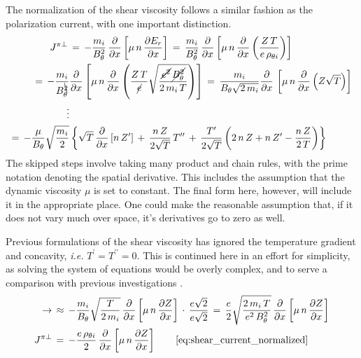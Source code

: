 The normalization of the shear viscosity follows a similar fashion as the polarization current, with one important distinction.
\begin{align} %
	J^{\pi\perp} \,&=\, -\frac{m_i}{B_\theta^2} \,
		\frac{\partial}{\partial x} \left[\mu \, n \, \frac{\partial E_r}
		{\partial x}\right]
		\,=\, \frac{m_i}{B_\theta^2} \, \frac{\partial}{\partial x}
		\left[\mu \, n \, \frac{\partial}{\partial x} \left(\frac{Z \, T}
		{e \, \rho_{\theta i}}\right)\right] \\
	=\, -\frac{m_i}{B_\theta^{\bcancel{2}}} &\frac{\partial}{\partial x}
		\left[\mu \, n \, \frac{\partial}{\partial x}\left(\frac{Z \, T}
		{\cancel{e}} \sqrt{\frac{\cancel{e^2} \,
		\cancel{B_\theta^{2}}}{2 \, m_i \, T}}\right)\right]
		\,=\, \frac{m_i}{B_\theta \sqrt{2 \, m_i}}
		\frac{\partial}{\partial x} \, \left[\mu \, n \, \frac{\partial}
		{\partial x} \left(Z \sqrt{T}\right)\right] \\
	\nonumber\vdots \\
	=\, -\frac{\mu}{B_\theta} \sqrt{\frac{m_i}{2}} &\left\{\sqrt{T} \,
		\frac{\partial}{\partial x} \left[n \, Z^\prime\right] \,+\,
		\frac{n \, Z}{2\sqrt{T}} \, T^{\prime\prime} \,+\,
		\frac{T^\prime}{2\sqrt{T}} \left(2 \, n \, Z + n \, Z^\prime -
		\frac{n \, Z}{2 \, T}\right)\right\}
\end{align}
The skipped steps involve taking many product and chain rules, with the prime notation denoting the spatial derivative.
This includes the assumption that the dynamic viscosity $\mu$ is set to constant.
The final form here, however, will include it in the appropriate place.
One could make the reasonable assumption that, if it does not vary much over space, it's derivatives go to zero as well.

Previous formulations of the shear viscosity has ignored the temperature gradient and concavity, \emph{i.e.} $T^\prime = T^{\prime\prime} = 0$.
This is continued here in an effort for simplicity, as solving the system of equations would be overly complex, and to serve a comparison with previous investigations \cite{staps_backstepping_2017}.
\begin{align} %
	\rightarrow\, &\approx\, -\frac{m_i}{B_\theta}
		\sqrt{\frac{T}{2 \, m_i}} \, \frac{\partial}{\partial x} \left[\mu \,
		n \, \frac{\partial Z}{\partial x} \right] \,\cdot\,
		\frac{e\sqrt{2}}{e\sqrt{2}}
		\,=\, \frac{e}{2} \sqrt{\frac{2 \, m_i \, T}{e^2 \, B_\theta^2}}
		\, \frac{\partial}{\partial x} \left[\mu \, n \, \frac{\partial Z}
		{\partial x} \right] \\
	J^{\pi\perp} \,&=\, -\frac{e \, \rho_{\theta i}}{2} \,
		\frac{\partial}{\partial x} \left[\mu \, n \, \frac{\partial Z}
		{\partial x}\right] \tag*{\eqref{eq:shear_current_normalized}}
\end{align}

